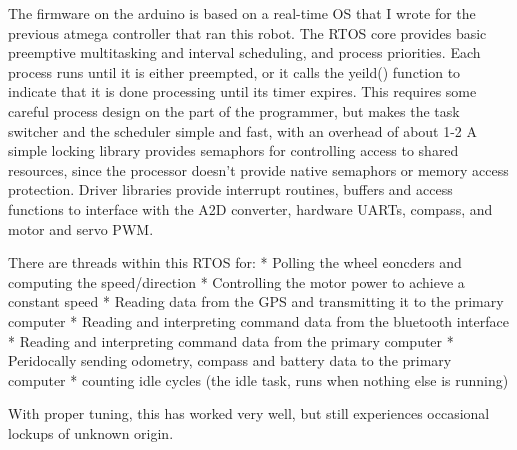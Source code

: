 
The firmware on the arduino is based on a real-time OS that I wrote for the previous atmega controller that ran this robot. 
The RTOS core provides basic preemptive multitasking and interval scheduling, and process priorities. Each process runs until it is either preempted, or it calls the yeild() function to indicate that it is done processing until its timer expires. This requires some careful process design on the part of the programmer, but makes the task switcher and the scheduler simple and fast, with an overhead of about 1-2%
A simple locking library provides semaphors for controlling access to shared resources, since the processor doesn't provide native semaphors or memory access protection.
Driver libraries provide interrupt routines, buffers and access functions to interface with the A2D converter, hardware UARTs, compass, and motor and servo PWM.

There are threads within this RTOS for:
* Polling the wheel eoncders and computing the speed/direction
* Controlling the motor power to achieve a constant speed
* Reading data from the GPS and transmitting it to the primary computer
* Reading and interpreting command data from the bluetooth interface
* Reading and interpreting command data from the primary computer
* Peridocally sending odometry, compass and battery data to the primary computer
* counting idle cycles (the idle task, runs when nothing else is running)

With proper tuning, this has worked very well, but still experiences occasional lockups of unknown origin.

